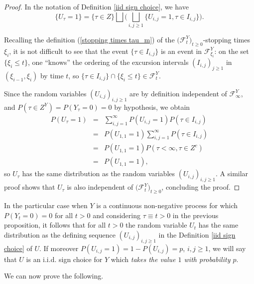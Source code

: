 \documentclass[reqno]{amsart}
\theoremstyle{definition}
\theoremstyle{remark}
\numberwithin{equation}{section}
\begin{document}
\begin{proof}
In the notation of Definition \ref{iid sign choice}, we have
\begin{equation}
\{U_\tau =1\}=\{\tau\in {Z}\} \bigsqcup \Bigg(\bigsqcup_{i,j\geq 1} \{U_{i,j}=1, \tau \in I_{i,j}\}\Bigg).
\end{equation}

Recalling the definition (\ref{stopping times tau_m}) of the $\big(\mathcal{F}^Y_t\big)_{t\ge 0}$-stopping times $\xi_i$,  it is not difficult to see that the event $\{\tau \in I_{i,j}\}$ is an event in $\mathcal{F}^Y_{\xi_i}$: on the set $\{\xi_i\leq t\}$, one ``knows'' the ordering of the excursion intervals $(I_{i,j}) _{j\geq 1}$ in $(\xi_{i-1},\xi_i)$ by time $t$, so $\{\tau \in I_{i,j}\}\cap \{\xi_i\leq t\}\in \mathcal{F}^Y_t$.

Since the random variables $(U_{i,j})_{i,j\ge 1}$ are by definition independent of $\mathcal{F}^Y_\infty$, and $P(\tau\in {Z}^Y)=P(Y_\tau=0)=0$ by hypothesis, we obtain
\begin{eqnarray*}
P(U_\tau =1)&=&\sum_{i,j=1}^\infty P(U_{i,j}=1) P(\tau \in I_{i,j})\\
&=&P(U_{1,1}=1) \sum_{i,j=1}^\infty P(\tau \in I_{i,j})\\
&=&P(U_{1,1}=1) P(\tau <\infty, \tau\in {Z}^c)\\
&=&P(U_{1,1}=1),
\end{eqnarray*}
so $U_\tau$ has the same distribution as the random variables $(U_{i,j})_{i,j\ge 1}$. A similar proof shows that $U_\tau$ is also independent of $\big(\mathcal{F}^Y_t\big)_{t \ge 0}$, concluding the proof.
\end{proof}

In the particular case when $Y$ is a continuous non-negative process for which $P(Y_t=0)=0$ for all $t>0$ and  considering $\tau\equiv t>0$ in the previous proposition, it follows that for all $t>0$ the random variable $U_t$ has the same distribution as the defining sequence $(U_{i,j})_{i,j\ge 1}$ in the Definition \ref{iid sign choice} of $U$. If moreover $P(U_{i,j}=1)=1-P(U_{i,j})=p$, $i,j\ge 1$, we will say that $U$ is an i.i.d. sign choice for $Y$ which \emph{takes the value $1$ with probability $p$}.

We can now prove the following.
\end{document}
